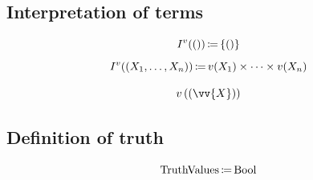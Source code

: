 \subsection{Interpretation of terms}
\[
I^v(())\,{\coloneqq}\, \{()\}
\]
\[
I^v((X_1,\dots,X_n))\,{\coloneqq}\, v(X_1)\times\dots\times v(X_n)
\]



\begin{definition}
\[
v\left(\left(\vv{X}\right)\right)
\]

\end{definition}


\subsection{Definition of truth}
\[
\mathrm{TruthValues} \,{\coloneqq}\, \mathrm{Bool}
\]

